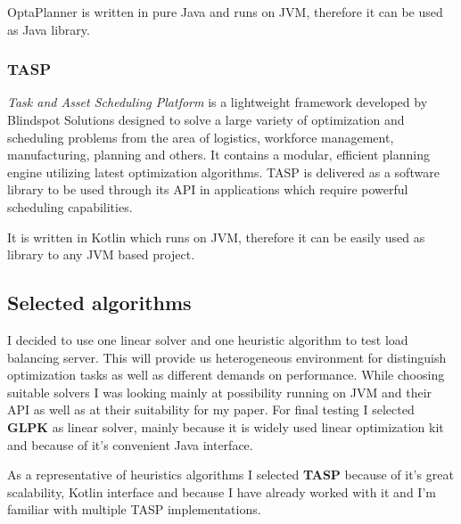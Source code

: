 OptaPlanner is written in pure Java and runs on JVM, therefore it can be used as Java library.

\subsubsection{TASP}\label{subsubsec:tasp}
\textit{Task and Asset Scheduling Platform} is a lightweight framework developed by Blindspot Solutions\cite{web:blindspot} designed to solve a large
variety of optimization and scheduling problems from the area of logistics, workforce management, manufacturing, planning and others.
It contains a modular, efficient planning engine utilizing latest optimization algorithms.
TASP is delivered as a software library to be used through its API in applications which require powerful scheduling capabilities.

It is written in Kotlin which runs on JVM, therefore it can be easily used as library to any JVM based project\@.

\subsection{Selected algorithms}\label{subsec:selected-algorithms}
I decided to use one linear solver and one heuristic algorithm to test load balancing server.
This will provide us heterogeneous environment for distinguish optimization tasks as well as different demands on performance.
While choosing suitable solvers I was looking mainly at possibility running on JVM and their API as well as at their suitability for my paper.
For final testing I selected \textbf{GLPK} as linear solver, mainly because it is widely used linear optimization kit
and because of it's convenient Java interface.

As a representative of heuristics algorithms I selected \textbf{TASP} because of it's great scalability, Kotlin interface
and because I have already worked with it and I'm familiar with multiple TASP implementations.

